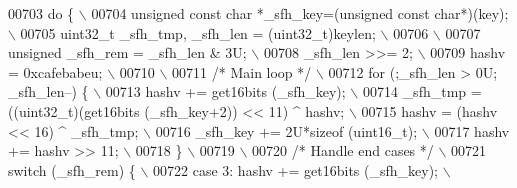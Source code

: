 \begin{DoxyCode}
{{{{{{{{00703 \textcolor{preprocessor}{do \{                                                                             \(\backslash\)}
00704 \textcolor{preprocessor}{  unsigned const char *\_sfh\_key=(unsigned const char*)(key);                     \(\backslash\)}
00705 \textcolor{preprocessor}{  uint32\_t \_sfh\_tmp, \_sfh\_len = (uint32\_t)keylen;                                \(\backslash\)}
00706 \textcolor{preprocessor}{                                                                                 \(\backslash\)}
00707 \textcolor{preprocessor}{  unsigned \_sfh\_rem = \_sfh\_len & 3U;                                             \(\backslash\)}
00708 \textcolor{preprocessor}{  \_sfh\_len >>= 2;                                                                \(\backslash\)}
00709 \textcolor{preprocessor}{  hashv = 0xcafebabeu;                                                           \(\backslash\)}
00710 \textcolor{preprocessor}{                                                                                 \(\backslash\)}
00711 \textcolor{preprocessor}{  }\textcolor{comment}{/* Main loop */}\textcolor{preprocessor}{                                                                \(\backslash\)}
00712 \textcolor{preprocessor}{  for (;\_sfh\_len > 0U; \_sfh\_len--) \{                                             \(\backslash\)}
00713 \textcolor{preprocessor}{    hashv    += get16bits (\_sfh\_key);                                            \(\backslash\)}
00714 \textcolor{preprocessor}{    \_sfh\_tmp  = ((uint32\_t)(get16bits (\_sfh\_key+2)) << 11) ^ hashv;              \(\backslash\)}
00715 \textcolor{preprocessor}{    hashv     = (hashv << 16) ^ \_sfh\_tmp;                                        \(\backslash\)}
00716 \textcolor{preprocessor}{    \_sfh\_key += 2U*sizeof (uint16\_t);                                            \(\backslash\)}
00717 \textcolor{preprocessor}{    hashv    += hashv >> 11;                                                     \(\backslash\)}
00718 \textcolor{preprocessor}{  \}                                                                              \(\backslash\)}
00719 \textcolor{preprocessor}{                                                                                 \(\backslash\)}
00720 \textcolor{preprocessor}{  }\textcolor{comment}{/* Handle end cases */}\textcolor{preprocessor}{                                                         \(\backslash\)}
00721 \textcolor{preprocessor}{  switch (\_sfh\_rem) \{                                                            \(\backslash\)}
00722 \textcolor{preprocessor}{    case 3: hashv += get16bits (\_sfh\_key);                                       \(\backslash\)}
}}}}}}}}
\end{DoxyCode}
